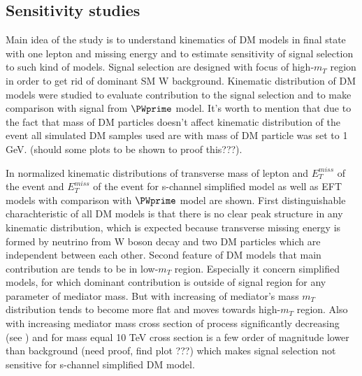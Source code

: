 \subsection{Sensitivity studies}

Main idea of the study is to understand kinematics of DM models in final state with one lepton and missing energy and to estimate sensitivity 
of signal selection to such kind of models.
Signal selection are designed with focus of high-$m_{T}$ region in order to get rid of dominant SM W background.
Kinematic distribution of DM models were studied to evaluate contribution to the signal selection and to make comparison
with signal from $\PWprime$ model.
It's worth to mention that due to the fact that mass of DM particles doesn't affect kinematic distribution of the event 
all simulated DM samples used are with mass of DM particle was set to 1 GeV.
(should some plots to be shown to proof this???).

In  normalized kinematic distributions of transverse mass of lepton and $E_{T}^{miss}$ of the event
and $E_{T}^{miss}$ of the event for s-channel simplified model as well as EFT models with comparison with $\PWprime$ model are shown.
First distinguishable charachteristic of all DM models is that there is no clear peak structure in any kinematic distribution, 
which is expected because transverse missing energy is formed by
neutrino from W boson decay and two DM particles which are independent between each other. 
Second feature of DM models that main contribution are tends to be in low-$m_{T}$ region.
Especially it concern simplified models, for which dominant contribution is outside of signal region for any parameter of mediator mass.
But with increasing of mediator's mass $m_{T}$ distribution tends to become more flat and moves towards high-$m_{T}$ region.
Also with increasing mediator mass cross section of process significantly decreasing (see ) 
and for mass equal 10 TeV cross section is a few order of magnitude lower than background (need proof, find plot ???) which 
makes signal selection not sensitive for s-channel simplified DM model.


